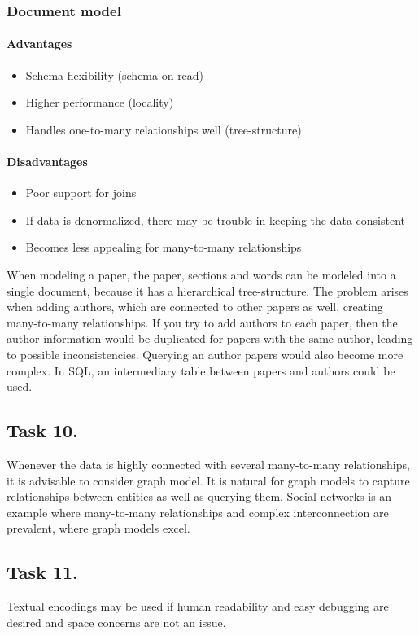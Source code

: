 \documentclass[12pt, titlepage]{report}
\begin{document}
\subsubsection{Document model}
\paragraph{Advantages}
\begin{itemize}
    \item Schema flexibility (schema-on-read)
    \item Higher performance (locality)
    \item Handles one-to-many relationships well (tree-structure)
\end{itemize}
\paragraph{Disadvantages}
\begin{itemize}
    \item Poor support for joins
    \item If data is denormalized, there may be trouble in keeping the data consistent
    \item Becomes less appealing for many-to-many relationships
\end{itemize}

When modeling a paper, the paper, sections and words can be modeled into a single document, because it has a hierarchical tree-structure. The problem arises when adding authors, which are connected to other papers as well, creating many-to-many relationships. If you try to add authors to each paper, then the author information would be duplicated for papers with the same author, leading to possible inconsistencies. Querying an author papers would also become more complex. In SQL, an intermediary table between papers and authors could be used.
\subsection*{Task 10.}
Whenever the data is highly connected with several many-to-many relationships, it is advisable to consider graph model. It is natural for graph models to capture relationships between entities as well as querying them. Social networks is an example where many-to-many relationships and complex interconnection are prevalent, where graph models excel.
\subsection*{Task 11.}
Textual encodings may be used if human readability and easy debugging are desired and space concerns are not an issue.
\end{document}
